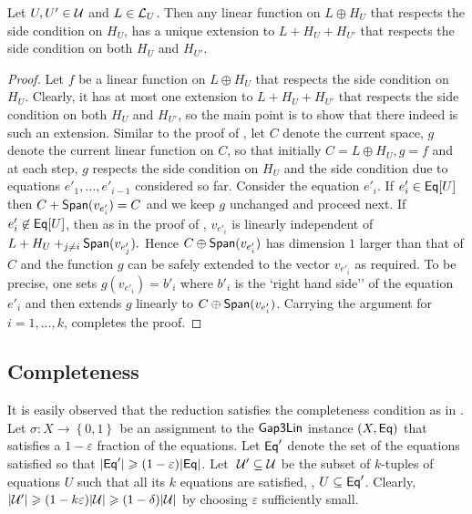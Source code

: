 \documentclass{toc}
\newcommand\set[1]{{\left\{ #1 \right\}}}
\newcommand\power[1]{\set{0,1}^{#1}}
\newcommand\eps{\varepsilon}
\newcommand*\xor{\mathbin{\oplus}}
\renewcommand\geq{\geqslant}
\begin{document}
\begin{lemma}\label{lem:intuition_aux3} Let $U, U' \in {\cal U}$ and $L \in {\cal L}_U$.  Then any linear function on $L\xor H_U$ that respects the side condition on $H_U$,
has a unique extension to $L + H_U + H_{U'}$ that respects the side condition on both $H_U$ and $H_{U'}$.
\end{lemma}
\begin{proof} Let $f$ be a linear function on $L\xor H_U$ that respects the side condition on $H_U$. Clearly, it has at most one extension
to $L + H_U + H_{U'}$ that respects the side condition on both $H_U$ and $H_{U'}$, so the main point is to show that  there indeed is
such an extension. Similar to the proof of , let $C$ denote the current space, $g$ denote the current linear function on $C$,
 so that initially $C = L \xor H_U, g = f$ and at each step,
$g$ respects the side condition on $H_U$ and the side condition due to equations $e'_1, \ldots, e'_{i-1}$ considered so far. Consider
the equation $e'_i$. If $e'_i \in {\sf Eq}[U]$ then $C + {\sf Span} (v_{e'_i}) = C$ and we keep $g$ unchanged and proceed next. If $e'_i \not\in {\sf Eq}[U]$, then
as in the proof of , $v_{e'_i}$ is linearly independent of
$L + H_U +_{j \neq  i} {\sf Span}( v_{e'_j} ) . $ Hence $C \xor  {\sf Span}(v_{e'_i})$ has dimension $1$ larger than that of $C$ and
the function $g$ can be safely extended to
the  %
vector $v_{e'_i}$ as required. To be precise, one sets $g(v_{e'_i}) = b'_i$ where $b'_i$ is the
`right hand side'' of the equation $e'_i$ and then extends $g$ linearly to $C \xor  {\sf Span}(v_{e'_i})$. Carrying the argument for $i=1,\ldots,k$,
completes the proof.
\end{proof}

\subsection{Completeness}\label{section:completeness}
It is easily observed that the reduction satisfies the completeness condition as in . Let
 $\sigma \colon X \to \power{}$ be an assignment to the ${\sf Gap3Lin}$ instance $(X, {\sf Eq})$  that satisfies
 a %
 $1-\eps$ fraction of
 the equations. Let ${\sf Eq}'$ denote the set of the equations satisfied so that $|{\sf Eq}'| \geq (1-\eps) |{\sf Eq}|$.
Let $~{\cal U}' \subseteq {\cal U}$ be the subset of $k$-tuples of equations $U$ such that all its $k$ equations are satisfied, \ie,
$U \subseteq {\sf Eq}'$. Clearly, $|{\cal U}'| \geq (1-k\eps)|{\cal U}| \geq (1-\delta) |{\cal U}|$ by choosing $\eps$ sufficiently
small.
%
\end{document}

